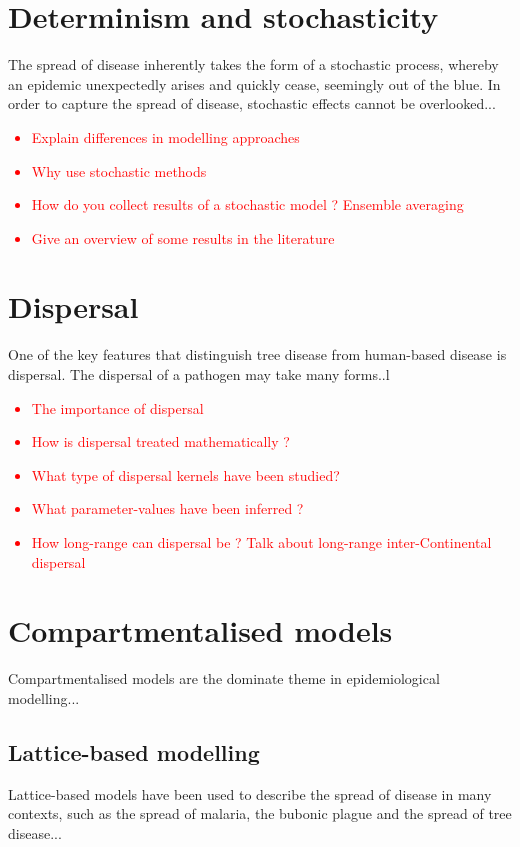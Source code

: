 \section{Determinism and stochasticity}

The spread of disease inherently takes the form of a stochastic process, whereby an epidemic unexpectedly arises and quickly cease, seemingly out of the blue. In order to capture the spread of disease, stochastic effects cannot be overlooked... 

\textcolor{red}{
\begin{itemize}
    \item Explain differences in modelling approaches
    \item Why use stochastic methods
    \item How do you collect results of a stochastic model ? Ensemble averaging
    \item Give an overview of some results in the literature
\end{itemize}}


\section{Dispersal}

One of the key features that distinguish tree disease from human-based disease is dispersal. The dispersal of a pathogen may take many forms..l
\textcolor{red}{
\begin{itemize}
    \item The importance of dispersal
    \item How is dispersal treated mathematically ?
    \item What type of dispersal kernels have been studied?
    \item What parameter-values have been inferred ?
    \item How long-range can dispersal be ? Talk about long-range inter-Continental dispersal
\end{itemize}}

\section{Compartmentalised models}
Compartmentalised models are the dominate theme in epidemiological modelling...

\subsection{Lattice-based modelling}
Lattice-based models have been used to describe the spread of disease in many contexts, such as the spread of malaria, the bubonic plague and the spread of tree disease...


